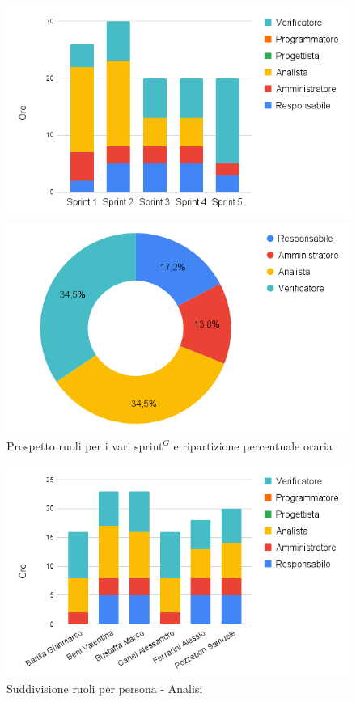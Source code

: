 \begin{figure}[h!]
	\centering
	\begin{minipage}[c]{0.3\textwidth}
    	\includegraphics[scale=0.43]{../../assets/Diagrammi_Excel/sprint_analisi.png}
	\end{minipage}
\hfill
	\begin{minipage}[c]{0.45\textwidth}
		\includegraphics[scale=0.37]{../../assets/Diagrammi_Excel/tortanalisi.png}
	\end{minipage}
	\caption{Prospetto ruoli per i vari sprint$^{G}$ e ripartizione percentuale oraria}
\end{figure}

\begin{figure}[h!]
	\centering
	\includegraphics[scale=0.47]{../../assets/Diagrammi_Excel/person_analisi.png}
	\caption{Suddivisione ruoli per persona - Analisi}
\end{figure}



